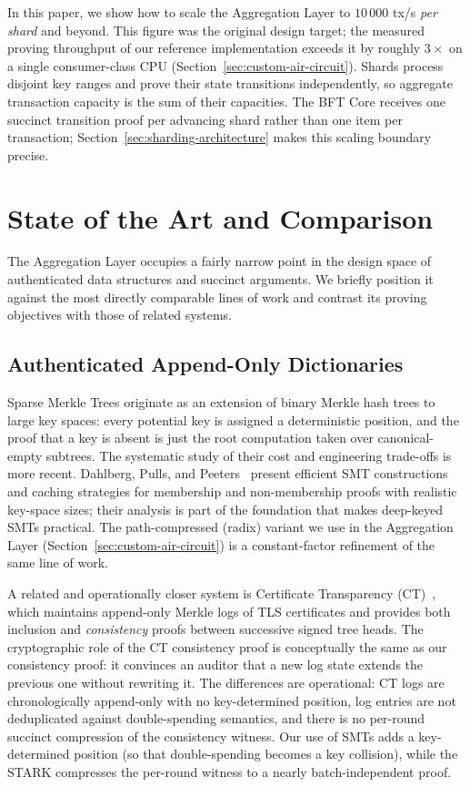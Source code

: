 \documentclass[11pt]{article}
\begin{document}
In this paper, we show how to scale the Aggregation Layer to $10\,000$ tx/s \emph{per shard} and beyond. This figure was the original design target; the measured proving throughput of our reference implementation exceeds it by roughly $3\times$ on a single consumer-class CPU (Section~\ref{sec:custom-air-circuit}). Shards process disjoint key ranges and prove their state transitions independently, so aggregate transaction capacity is the sum of their capacities. The BFT Core receives one succinct transition proof per advancing shard rather than one item per transaction; Section~\ref{sec:sharding-architecture} makes this scaling boundary precise.


\section{State of the Art and Comparison}
\label{sec:sota}

The Aggregation Layer occupies a fairly narrow point in the design space of authenticated data structures and succinct arguments. We briefly position it against the most directly comparable lines of work and contrast its proving objectives with those of related systems.

\subsection{Authenticated Append-Only Dictionaries}

Sparse Merkle Trees originate as an extension of binary Merkle hash trees to large key spaces: every potential key is assigned a deterministic position, and the proof that a key is absent is just the root computation taken over canonical-empty subtrees. The systematic study of their cost and engineering trade-offs is more recent. Dahlberg, Pulls, and Peeters~\cite{dahlberg2016smt} present efficient SMT constructions and caching strategies for membership and non-membership proofs with realistic key-space sizes; their analysis is part of the foundation that makes deep-keyed SMTs practical. The path-compressed (radix) variant we use in the Aggregation Layer (Section~\ref{sec:custom-air-circuit}) is a constant-factor refinement of the same line of work.

A related and operationally closer system is Certificate Transparency (CT)~\cite{rfc6962}, which maintains append-only Merkle logs of TLS certificates and provides both inclusion and \emph{consistency} proofs between successive signed tree heads. The cryptographic role of the CT consistency proof is conceptually the same as our consistency proof: it convinces an auditor that a new log state extends the previous one without rewriting it. The differences are operational: CT logs are chronologically append-only with no key-determined position, log entries are not deduplicated against double-spending semantics, and there is no per-round succinct compression of the consistency witness. Our use of SMTs adds a key-determined position (so that double-spending becomes a key collision), while the STARK compresses the per-round witness to a nearly batch-independent proof.
\end{document}
